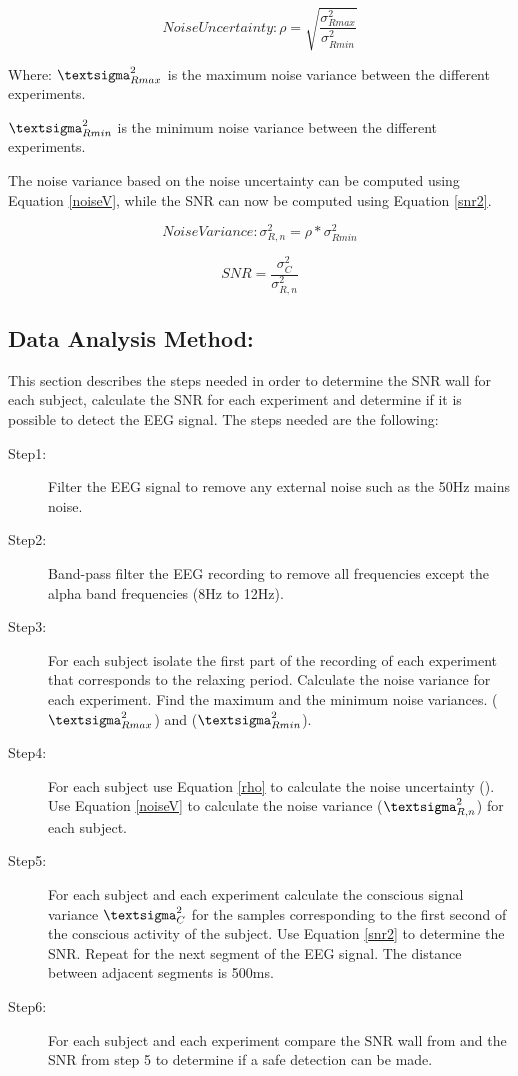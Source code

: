 \begin{equation}
Noise  Uncertainty:  \rho = \sqrt{\frac{\sigma_{Rmax}^2 }{\sigma_{Rmin}^2 }}
\label{rho}
\end{equation}

Where:  $\textsigma_{Rmax}^2$ is the maximum noise variance between the different experiments. 

\hspace{12mm} $\textsigma_{Rmin}^2$ is the minimum noise variance between the different experiments.
 
The noise variance based on the noise uncertainty can be computed using  Equation \ref{noiseV},  while the SNR can now be computed using  Equation \ref{snr2}.

\begin{equation}
Noise  Variance: \sigma_{R,n}^2 = \rho * \sigma_{Rmin}^2 
\label{noiseV}
\end{equation}

\begin{equation}
SNR =  \frac{\sigma_{C}^2 }{\sigma_{R,n}^2 }
\label{snr2}
\end{equation}


\subsection{\bf{Data Analysis Method:}}
This section describes the steps needed in order to determine the SNR wall for each subject, calculate the SNR for each experiment and determine if it is possible to detect the EEG signal. The steps needed are the following:
\begin{description}
 	\item[Step1: ] Filter the EEG signal to remove any external noise such as the 50Hz mains noise.
	\item[Step2: ] Band-pass filter the EEG recording to remove all frequencies except the alpha band frequencies (8Hz to 12Hz). 
	\item[Step3: ] 	For each subject isolate the first part of the recording of each experiment that corresponds to the relaxing period. Calculate the noise variance for each experiment. Find the maximum and the minimum noise variances. ($\textsigma_{Rmax}^2$) and ($\textsigma_{Rmin}^2$).
	\item[Step4: ] For each subject use Equation \ref{rho} to calculate the noise uncertainty (\textrho). Use Equation \ref{noiseV} to calculate the noise variance ($\textsigma_{R,n}^2$) for each subject. 
	\item[Step5: ] For each subject and each experiment calculate the conscious signal variance  $\textsigma_{C}^2$ for the samples corresponding to the first second of the conscious activity of the subject. Use Equation \ref{snr2} to determine the SNR. Repeat for the next segment of the EEG signal. The distance between adjacent segments is 500ms. 
	\item[Step6: ] For each subject and each experiment compare the SNR wall from  \citep{Porr2018} and the SNR from step 5 to determine if a safe detection can be made.  
  
\end{description}

